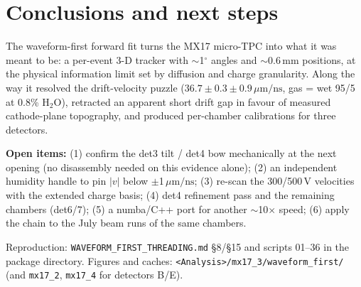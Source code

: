 \documentclass[11pt,a4paper]{article}
\newcommand{\um}{\,\mu\mathrm{m/ns}}
\begin{document}
\section{Conclusions and next steps}

The waveform-first forward fit turns the MX17 micro-TPC into what it was meant
to be: a per-event 3-D tracker with $\sim$1$^\circ$ angles and
$\sim$0.6\,mm positions, at the physical information limit set by diffusion
and charge granularity. Along the way it resolved the drift-velocity puzzle
($36.7\pm0.3\pm0.9\um$, gas = wet 95/5 at 0.8\% H$_2$O), retracted an apparent
short drift gap in favour of measured cathode-plane topography, and produced
per-chamber calibrations for three detectors.

\textbf{Open items:} (1) confirm the det3 tilt / det4 bow mechanically at the
next opening (no disassembly needed on this evidence alone); (2) an independent
humidity handle to pin $|v|$ below $\pm$1$\um$; (3) re-scan the 300/500\,V
velocities with the extended charge basis; (4) det4 refinement pass and the
remaining chambers (det6/7); (5) a numba/C++ port for another
$\sim$10$\times$ speed; (6) apply the chain to the July beam runs of the same
chambers.

\vfill
\noindent\small Reproduction: \texttt{WAVEFORM\_FIRST\_THREADING.md} \S8/\S15
and scripts 01--36 in the package directory. Figures and caches:
\texttt{<Analysis>/mx17\_3/waveform\_first/} (and \texttt{mx17\_2},
\texttt{mx17\_4} for detectors B/E).
\end{document}
